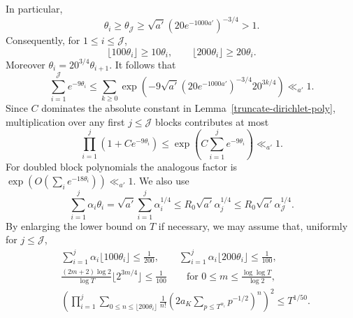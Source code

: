 \documentclass[twoside,reqno,11pt,a4paper]{amsart}
\numberwithin{equation}{section}
\theoremstyle{plain}
\theoremstyle{definition}
\theoremstyle{remark}
\renewcommand{\le}{\leqslant}
\renewcommand{\ge}{\geqslant}
\begin{document}
    In particular,
    \begin{equation*}
\theta_i\ge\theta_{\mathcal J}\ge
            \sqrt{a'}\left(20e^{-1000a'}\right)^{-3/4}>1.
    \end{equation*}
    Consequently, for $1\le i\le\mathcal J$,
    \begin{equation}\label{eq:all-truncation-lengths}
            \lfloor100\theta_i\rfloor\ge10\theta_i,
            \qquad
            \lfloor200\theta_i\rfloor\ge20\theta_i.
    \end{equation}
    Moreover $\theta_i=20^{3/4}\theta_{i+1}$.  It follows that
    \begin{equation}\label{eq:truncation-errors-summable}
    \sum_{i=1}^{\mathcal J}e^{-9\theta_i}
    \le
    \sum_{k\ge0}\exp\left(-9\sqrt{a'}
    \left(20e^{-1000a'}\right)^{-3/4}20^{3k/4}\right)
    \ll_{a'}1.
    \end{equation}
    Since $C$ dominates the absolute constant in
    Lemma~\ref{truncate-dirichlet-poly}, multiplication over any first
    $j\le\mathcal J$ blocks contributes at most
    \begin{equation}\label{eq:truncation-error-product}
    \prod_{i=1}^{j}\left(1+Ce^{-9\theta_i}\right)
    \le\exp\left(C\sum_{i=1}^{j}e^{-9\theta_i}\right)
    \ll_{a'}1.
    \end{equation}
    For doubled block polynomials the analogous factor is
    $\exp(O(\sum_i e^{-18\theta_i}))\ll_{a'}1$.  We also use
    \begin{equation}\label{eq:geometric-support-sum}
        \sum_{i=1}^j\alpha_i\theta_i
        =\sqrt{a'}\sum_{i=1}^j\alpha_i^{1/4}
        \le R_0\sqrt{a'}\alpha_j^{1/4}
        \le R_0\sqrt{a'}\alpha_{\mathcal J}^{1/4}.
    \end{equation}
By enlarging the lower bound on $T$ if necessary, we may assume that, uniformly for
    $j\le\mathcal J$,
    \begin{align}
     &\sum_{i=1}^j\alpha_i\lfloor100\theta_i\rfloor
            \le\frac1{200},\qquad
        \sum_{i=1}^j\alpha_i\lfloor200\theta_i\rfloor
            \le\frac1{100},\nonumber\\
       & \frac{(2m+2)\log2}{\log T}\lfloor2^{3m/4}\rfloor
            \le\frac1{100}
            \qquad \text{for }0\le m\le\frac{\log\log T}{\log2},\nonumber\\
        &\left(\prod_{i=1}^j
        \sum_{0\le n\le\lfloor200\theta_i\rfloor}
        \frac1{n!}\left(2a_K\sum_{p\le T^{\alpha_i}}p^{-1/2}\right)^n
        \right)^2\le T^{1/50}.
        \label{eq:numerical-support-bounds}
    \end{align}
\end{document}
